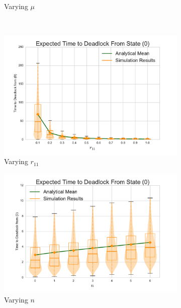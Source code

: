 \documentclass{article}
\numberwithin{equation}{section}
\begin{document}
\begin{figure}[!htbp]
\begin{center}
\begin{subfigure}[b]{0.35\textwidth}
    \caption{Varying $\mu$}
    \label{fig:1Nms_mu}
  \end{subfigure}\\
  \begin{subfigure}[b]{0.35\textwidth}
    \includegraphics[width=\textwidth]{images/varyr11_1Nms}
    \caption{Varying $r_{11}$}
    \label{fig:1Nms_r11}
  \end{subfigure}
  \begin{subfigure}[b]{0.35\textwidth}
    \includegraphics[width=\textwidth]{images/varyn_1Nms}
    \caption{Varying $n$}
    \label{fig:1Nms_n}
  \end{subfigure}\\
  \begin{subfigure}[b]{0.35\textwidth}

\end{subfigure}
\end{center}
\end{figure}
\end{document}
